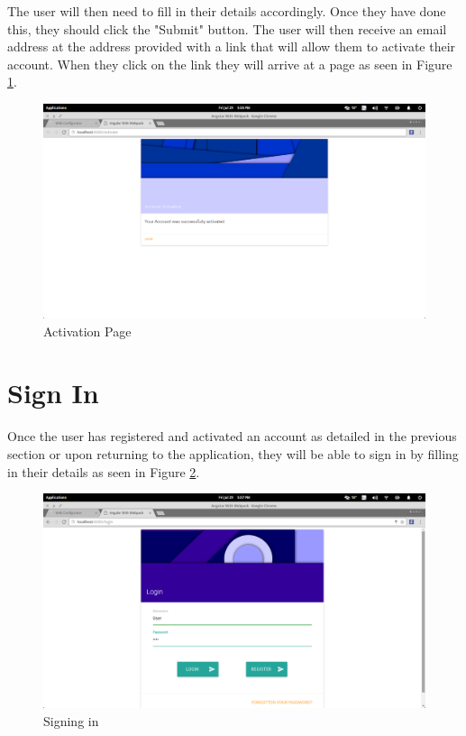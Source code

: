 \documentclass[11pt,a4paper]{article}
\begin{document}
The user will then need to fill in their details accordingly. Once they have done this, they should click the "Submit" 
button. The user will then receive an email address at the address provided with a link that will allow them to activate
their account. When they click on the link they will arrive at a page as seen in Figure \ref{fig:activatePage}.
\begin{figure}[H]
	\begin{center}
		\includegraphics[scale=0.3]{../Images/User Manual/Activation Page.png}
		\caption{Activation Page}
		\label{fig:activatePage}
	\end{center}  
\end{figure}

\section{Sign In}
Once the user has registered and activated an account as detailed in the previous section or upon returning to the application,
they will be able to sign in by filling in their details as seen in Figure \ref{fig:signPage}.
\begin{figure}[H]
	\begin{center}
		\includegraphics[scale=0.3]{../Images/User Manual/Sign in Page.png}
		\caption{Signing in}
		\label{fig:signPage}
	\end{center}  
\end{figure}
\end{document}
